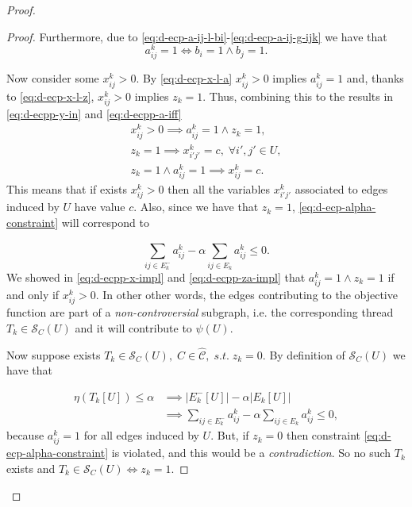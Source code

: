 \begin{proof}
\begin{proof}
		Furthermore, due to \eqref{eq:d-ecp-a-ij-l-bi}-\eqref{eq:d-ecp-a-ij-g-ijk} we
		have that
		\begin{equation}
			\label{eq:d-ecpp-a-iff}
			a_{ij}^{k} = 1 \iff b_i = 1 \land b_j = 1.
		\end{equation}

		Now consider some $x_{ij}^{k} > 0 $. By \eqref{eq:d-ecp-x-l-a}
		$x_{ij}^{k} > 0$ implies $a _{ij}^{k} = 1$ and, thanks to
		\eqref{eq:d-ecp-x-l-z}, $x_{ij}^{k} > 0$ implies $z_k = 1$. Thus, combining
		this to the results in \eqref{eq:d-ecpp-y-in} and
		\eqref{eq:d-ecpp-a-iff}
		\begin{gather}
			\label{eq:d-ecpp-x-impl}
			x_{ij}^{k} > 0 \implies a_{ij}^{k} = 1 \land z_k =1, \\
			\label{eq:d-ecpp-z-impl}
			z_k = 1 \implies x_{i'j'}^{k} = c, \; \forall i', j' \in U, \\
			\label{eq:d-ecpp-za-impl}
			z_k = 1 \land a_{ij}^{k} = 1 \implies x_{ij}^{k} = c.
		\end{gather}
		This means that if exists $ x_{ij}^{k} > 0$ then all the variables
		$x_{i'j'}^{k}$ associated to edges induced by $U$ have value $c$.
		Also, since we have that $z_k = 1$, \eqref{eq:d-ecp-alpha-constraint}
		will correspond to

		\begin{equation}
			\sum^{}_{ij \in E^-_k} a_{ij}^{k}  - \alpha \sum^{}_{ij \in E_k}
			a_{ij} ^{k} \leq 0.
		\end{equation}
		We showed in \eqref{eq:d-ecpp-x-impl} and \eqref{eq:d-ecpp-za-impl} that $a_{ij}^{k} = 1 \land z_k
			= 1$ if and only if $x_{ij}^{k} > 0 $. In other other words, the edges contributing to the objective
		function are part of a \emph{non-controversial} subgraph, i.e. the
		corresponding thread $T_k \in
			\mathcal{S}_C(U)$ and it will contribute to $\psi(U)$.

		Now suppose exists $ T_k \in \mathcal{S}_C(U), \; C \in \mathcal{\hat{C}},
			\; s.t. \; z_k = 0$. By definition of $\mathcal{S}_C(U)$ we have that

		\begin{align}
			\eta(T_k[U]) \leq \alpha & \implies |E^{-}_{k}[U]| - \alpha |E_{k}[U]|
			\\
			                         & \implies \sum^{}_{ij \in E^-_k}
			a_{ij}^{k}  - \alpha \sum^{}_{ij \in E_k}
			a_{ij} ^{k} \leq 0,
		\end{align}
		because $a_{ij}^{k} = 1$ for all edges induced by $U$. But, if $z_k =
			0$ then constraint \eqref{eq:d-ecp-alpha-constraint} is violated,
		and this would be a \emph{contradiction}. So no such $T_k$ exists and $T_k
			\in \mathcal{S}_C(U) \iff z_k = 1$.


\end{proof}
\end{proof}

